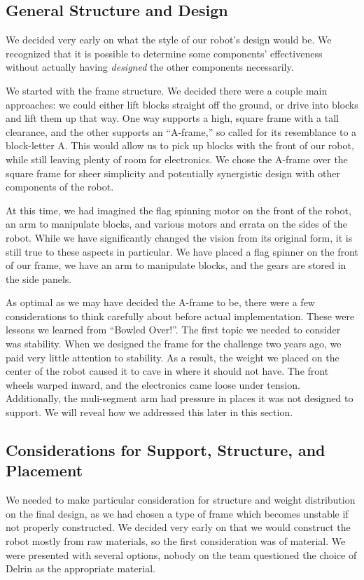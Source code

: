 \subsection{General Structure and Design}
We decided very early on what the style of our robot's design would be. We recognized that it is possible to determine some components' effectiveness without actually having \textit{designed} the other components necessarily. 

We started with the frame structure. We decided there were a couple main approaches: we could either lift blocks straight off the ground, or drive into blocks and lift them up that way. One way supports a high, square frame with a tall clearance, and the other supports an ``A-frame,'' so called for its resemblance to a block-letter A. This would allow us to pick up blocks with the front of our robot, while still leaving plenty of room for electronics. We chose the A-frame over the square frame for sheer simplicity and potentially synergistic design with other components of the robot. 

At this time, we had imagined the flag spinning motor on the front of the robot, an arm to manipulate blocks, and various motors and errata on the sides of the robot. While we have significantly changed the vision from its original form, it is still true to these aspects in particular. We have placed a flag spinner on the front of our frame, we have an arm to manipulate blocks, and the gears are stored in the side panels. 

As optimal as we may have decided the A-frame to be, there were a few considerations to think carefully about before actual implementation. These were lessons we learned from ``Bowled Over!''. The first topic we needed to consider was stability. When we designed the frame for the challenge two years ago, we paid very little attention to stability. As a result, the weight we placed on the center of the robot caused it to cave in where it should not have. The front wheels warped inward, and the electronics came loose under tension. Additionally, the muli-segment arm had pressure in places it was not designed to support. We will reveal how we addressed this later in this section.

\subsection{Considerations for Support, Structure, and Placement}
We needed to make particular consideration for structure and weight distribution on the final design, as we had chosen a type of frame which becomes unstable if not properly constructed. We decided very early on that we would construct the robot mostly from raw materials, so the first consideration was of material. We were presented with several options, nobody on the team questioned the choice of Delrin as the appropriate material.

